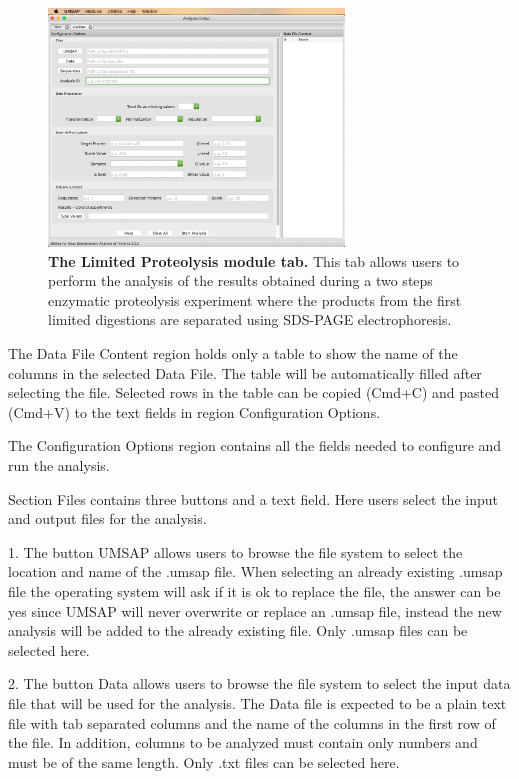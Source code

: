 \begin{figure}[h]
    \centering
    \includegraphics[width=0.7\textwidth]{./IMAGES/MOD-LIMPROT/limprot-mod.jpg}
    \caption[The Limited Proteolysis module tab]{\textbf{The Limited Proteolysis
    module tab.} This tab allows users to perform the analysis of the results obtained
    during a two steps enzymatic proteolysis experiment where the products from the
    first limited digestions are separated using SDS-PAGE electrophoresis.}
    \label{fig:limprotTab}
    \vspace{-5pt}
\end{figure}

The Data File Content region holds only a table to show the name of the columns in
the selected Data File. The table will be automatically filled after selecting the
file. Selected rows in the table can be copied (Cmd+C) and pasted (Cmd+V) to the
text fields in region Configuration Options.

The Configuration Options region contains all the fields needed to configure and
run the analysis.

Section Files contains three buttons and a text field. Here users select the input
and output files for the analysis.

\num{1}. The button UMSAP allows users to browse the file system to select the location
and name of the .umsap file. When selecting an already existing .umsap file the operating
system will ask if it is ok to replace the file, the answer can be yes since UMSAP
will never overwrite or replace an .umsap file, instead the new analysis will be
added to the already existing file. Only .umsap files can be selected here.

\num{2}. The button Data allows users to browse the file system to select the input
data file that will be used for the analysis. The Data file is expected to be a
plain text file with tab separated columns and the name of the columns in the first
row of the file. In addition, columns to be analyzed must contain only numbers and
must be of the same length. Only .txt files can be selected here.

